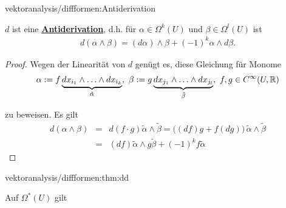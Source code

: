 \begin{theorem}{}{vektoranalysis/diffformen:Antiderivation}



\par
\(d\) ist eine \href{https://de.wikipedia.org/wiki/Derivation\_(Mathematik)\#Antiderivationen}{\textbf{Antiderivation}}, d.h. für \(\alpha\in\Omega^k(U)\) und \(\beta\in\Omega^l(U)\) ist
\begin{align*}
d(\alpha\wedge\beta) = (d\alpha)\wedge\beta+(-1)^k\alpha\wedge d\beta.
\end{align*}\end{theorem}

\begin{proof}
 Wegen der Linearität von \(d\) genügt es, diese Gleichung für Monome
\begin{align*}
\alpha := f\underbrace{dx_{i_1}\wedge\ldots\wedge dx_{i_k}}_{\tilde
{\alpha}},\ \beta := g\underbrace{dx_{j_1}\wedge\ldots\wedge dx_{j_l}}_
{\tilde{\beta}},\ f,g\in C^\infty(U,\mathbb{R})
\end{align*}
\par
zu beweisen.
Es gilt
\begin{align*}
d(\alpha\wedge\beta) &=& d(f\cdot g)\tilde{\alpha}\wedge
\tilde{\beta} = \big((df)g+f(dg)\big)\,\tilde{\alpha}\wedge\tilde{\beta}\\
&=& (df)\tilde{\alpha}\wedge g\tilde{\beta}+ (-1)^kf\tilde{\alpha}
\end{align*}\end{proof}
\begin{theorem}{}{vektoranalysis/diffformen:thm:dd}



\par
Auf \(\Omega^*(U)\) gilt
\end{theorem}

